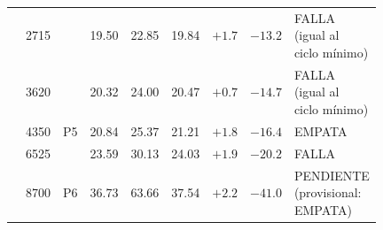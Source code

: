 \begin{tabular}{lrlrrrrrl}
 & 2715 &  & 19.50 & 22.85 & 19.84 & $+1.7$ & $-13.2$ & \makecell[tl]{FALLA\\{}(igual al\\{}ciclo mínimo)} \\
 & 3620 &  & 20.32 & 24.00 & 20.47 & $+0.7$ & $-14.7$ & \makecell[tl]{FALLA\\{}(igual al\\{}ciclo mínimo)} \\
 & 4350 & P5 & 20.84 & 25.37 & 21.21 & $+1.8$ & $-16.4$ & EMPATA \\
 & 6525 &  & 23.59 & 30.13 & 24.03 & $+1.9$ & $-20.2$ & FALLA \\
 & 8700 & P6 & 36.73 & 63.66 & 37.54 & $+2.2$ & $-41.0$ & \makecell[tl]{PENDIENTE\\{}(provisional:\\{}EMPATA)} \\
\bottomrule
\end{tabular}
